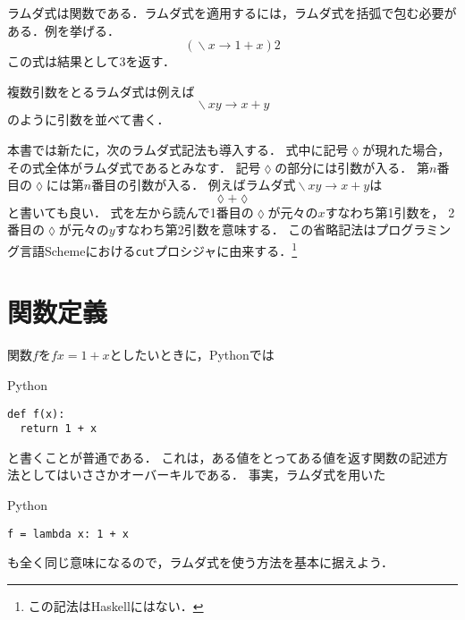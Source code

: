 \documentclass[a5paper,draft]{jsbook}
\newcommand{\programminglanguage}[1]{\textsf{#1}}
\newcommand{\haskell}{\programminglanguage{Haskell}}
\newcommand{\python}{\programminglanguage{Python}}
\newcommand{\scheme}{\programminglanguage{Scheme}}
\newcommand{\code}[1]{\texttt{#1}}
\newenvironment{pythoncode}{\begin{itembox}[r]{\python}}{\end{itembox}}
\newcommand{\pthnId}[1]{{DO NOT USE}--\textit{#1}}
\newcommand{\pthnKeyword}[1]{{DO NOT USE}--\textbf{#1}}
\newcommand{\pthnOp}[1]{{DO NOT USE}--\texttt{#1}}
\newcommand{\mathAnonymousParameter}{\lozenge}
\newcommand{\mathUnaryOperator}[1]{\operatorname{#1}}
\newcommand{\mathLambda}{\mathUnaryOperator{\backslash}}
\newcommand{\mathLambdaArrow}{\rightarrow}
\newcommand{\mathLambdaExpression}[2]{\mathLambda#1\mathLambdaArrow#2}
\begin{document}
ラムダ式は関数である．ラムダ式を適用するには，ラムダ式を括弧で包む必要がある．例を挙げる．
\begin{equation}
\left(\mathLambdaExpression{x}{1+x}\right)2
\end{equation}
この式は結果として$3$を返す．

複数引数をとるラムダ式は例えば
\begin{equation}
\mathLambdaExpression{xy}{x+y}
\end{equation}
のように引数を並べて書く．

本書では新たに，次のラムダ式記法も導入する．
式中に記号$\mathAnonymousParameter$が現れた場合，
その式全体がラムダ式であるとみなす．
記号$\mathAnonymousParameter$の部分には引数が入る．
第$n$番目の$\mathAnonymousParameter$には第$n$番目の引数が入る．
例えばラムダ式$\mathLambdaExpression{xy}{x+y}$は
\begin{equation}
\mathAnonymousParameter+\mathAnonymousParameter
\end{equation}
と書いても良い．
式を左から読んで1番目の$\mathAnonymousParameter$が元々の$x$すなわち第1引数を，
2番目の$\mathAnonymousParameter$が元々の$y$すなわち第2引数を意味する．
この省略記法はプログラミング言語\scheme における\code{cut}プロシジャに由来する．\footnote{この記法は\haskell にはない．}


\section{関数定義}

関数$f$を$fx=1+x$としたいときに，\python では
\begin{pythoncode}
\begin{verbatim}
def f(x):
  return 1 + x
\end{verbatim}
\end{pythoncode}
と書くことが普通である．
これは，ある値をとってある値を返す関数の記述方法としてはいささかオーバーキルである．
事実，ラムダ式を用いた
\begin{pythoncode}
\begin{verbatim}
f = lambda x: 1 + x
\end{verbatim}
\end{pythoncode}
も全く同じ意味になるので，ラムダ式を使う方法を基本に据えよう．
\end{document}
